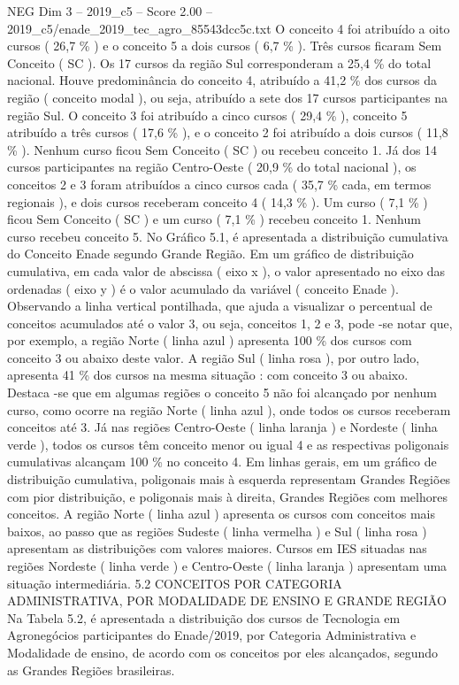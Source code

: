 \begin{textsample}{NEG Dim 3 – 2019\_c5 – Score 2.00 – 2019\_c5/enade\_2019\_tec\_agro\_85543dcc5c.txt}
O conceito 4 foi atribuído a oito cursos ( 26,7 \% ) e o conceito 5 a dois cursos ( 6,7 \% ).
Três cursos ficaram Sem Conceito ( SC ).
Os 17 cursos da região Sul corresponderam a 25,4 \% do total nacional.
Houve predominância do conceito 4, atribuído a 41,2 \% dos cursos da região ( conceito modal ), ou seja, atribuído a sete dos 17 cursos participantes na região Sul.
O conceito 3 foi atribuído a cinco cursos ( 29,4 \% ), conceito 5 atribuído a três cursos ( 17,6 \% ), e o conceito 2 foi atribuído a dois cursos ( 11,8 \% ).
Nenhum curso ficou Sem Conceito ( SC ) ou recebeu conceito 1.
Já dos 14 cursos participantes na região Centro-Oeste ( 20,9 \% do total nacional ), os conceitos 2 e 3 foram atribuídos a cinco cursos cada ( 35,7 \% cada, em termos regionais ), e dois cursos receberam conceito 4 ( 14,3 \% ).
Um curso ( 7,1 \% ) ficou Sem Conceito ( SC ) e um curso ( 7,1 \% ) recebeu conceito 1.
Nenhum curso recebeu conceito 5.
No Gráfico 5.1, é apresentada a distribuição cumulativa do Conceito Enade segundo Grande Região.
Em um gráfico de distribuição cumulativa, em cada valor de abscissa ( eixo x ), o valor apresentado no eixo das ordenadas ( eixo y ) é o valor acumulado da variável ( conceito Enade ).
Observando a linha vertical pontilhada, que ajuda a visualizar o percentual de conceitos acumulados até o valor 3, ou seja, conceitos 1, 2 e 3, pode -se notar que, por exemplo, a região Norte ( linha azul ) apresenta 100 \% dos cursos com conceito 3 ou abaixo deste valor.
A região Sul ( linha rosa ), por outro lado, apresenta 41 \% dos cursos na mesma situação : com conceito 3 ou abaixo.
Destaca -se que em algumas regiões o conceito 5 não foi alcançado por nenhum curso, como ocorre na região Norte ( linha azul ), onde todos os cursos receberam conceitos até 3.
Já nas regiões Centro-Oeste ( linha laranja ) e Nordeste ( linha verde ), todos os cursos têm conceito menor ou igual 4 e as respectivas poligonais cumulativas alcançam 100 \% no conceito 4.
Em linhas gerais, em um gráfico de distribuição cumulativa, poligonais mais à esquerda representam Grandes Regiões com pior distribuição, e poligonais mais à direita, Grandes Regiões com melhores conceitos.
A região Norte ( linha azul ) apresenta os cursos com conceitos mais baixos, ao passo que as regiões Sudeste ( linha vermelha ) e Sul ( linha rosa ) apresentam as distribuições com valores maiores.
Cursos em IES situadas nas regiões Nordeste ( linha verde ) e Centro-Oeste ( linha laranja ) apresentam uma situação intermediária. 5.2 CONCEITOS POR CATEGORIA ADMINISTRATIVA, POR MODALIDADE DE ENSINO E GRANDE REGIÃO Na Tabela 5.2, é apresentada a distribuição dos cursos de Tecnologia em Agronegócios participantes do Enade/2019, por Categoria Administrativa e Modalidade de ensino, de acordo com os conceitos por eles alcançados, segundo as Grandes Regiões brasileiras.

\end{textsample}
